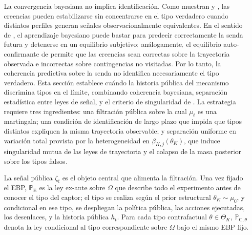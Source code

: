 \documentclass[pdflatex,sn-mathphys-ay]{sn-jnl}
\theoremstyle{thmstyleone}
\theoremstyle{thmstyletwo}
\theoremstyle{thmstylethree}
\newcommand{\ProbE}{\mathbb{P}_{\mathrm{E}}}
\newcommand{\ProbC}[1]{\mathbb{P}_{\mathrm{C},#1}}
\newcommand{\ThetaK}{\Theta_K}
\newcommand{\1}{\mathbf{1}}
\begin{document}
La convergencia bayesiana no implica identificación. Como muestran \citet{Doob1953Stochastic} y \citet{BlackwellDubins1962}, las creencias pueden estabilizarse sin concentrarse en el tipo verdadero cuando distintos perfiles generan señales observacionalmente equivalentes. En el sentido de \citet{KalaiLehrer1993}, el aprendizaje bayesiano puede bastar para predecir correctamente la senda futura y detenerse en un equilibrio subjetivo; análogamente, el equilibrio auto-confirmante de \citet{FudenbergLevine1993SCE} permite que las creencias sean correctas sobre la trayectoria observada e incorrectas sobre contingencias no visitadas. Por lo tanto, la coherencia predictiva sobre la senda no identifica necesariamente el tipo verdadero. Esta sección establece cuándo la historia pública del mecanismo discrimina tipos en el límite, combinando coherencia bayesiana, separación estadística entre leyes de señal, y el criterio de singularidad de \citet{Kakutani1948}. La estrategia requiere tres ingredientes: una filtración pública sobre la cual $\mu_t$ es una martingala; una condición de identificación de largo plazo que impida que tipos distintos expliquen la misma trayectoria observable; y separación uniforme en variación total provista por la heterogeneidad en $\beta_{K,j}(\theta_K)$, que induce singularidad mutua de las leyes de trayectoria y el colapso de la masa posterior sobre los tipos falsos.

La señal pública $\zeta_t$ es el objeto central que alimenta la filtración. Una vez fijado el EBP, $\ProbE$ es la ley ex-ante sobre $\Omega$ que describe todo el experimento antes de conocer el tipo del captor; el tipo se realiza según el prior estructural $\theta_K\sim\mu_0$, y condicional en ese tipo, se despliegan la política pública, las acciones ejecutadas, los desenlaces, y la historia pública $h_t$. Para cada tipo contrafactual $\theta\in\ThetaK$, $\ProbC{\theta}$ denota la ley condicional al tipo correspondiente sobre $\Omega$ bajo el mismo EBP fijo.
\end{document}

